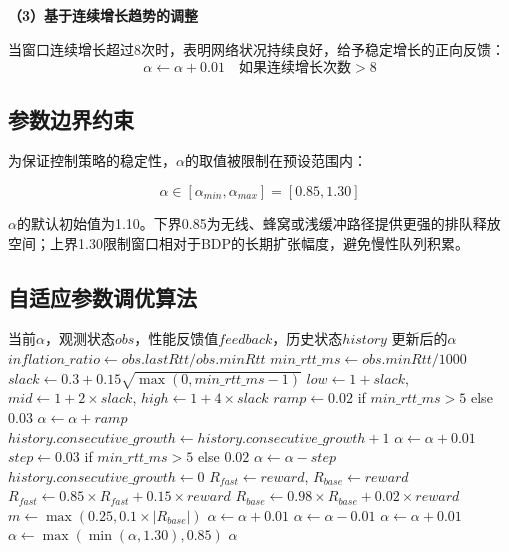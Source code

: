 \textbf{（3）基于连续增长趋势的调整}

当窗口连续增长超过8次时，表明网络状况持续良好，给予稳定增长的正向反馈：
\begin{equation}
\alpha \leftarrow \alpha + 0.01 \quad \text{如果连续增长次数} > 8
\end{equation}

\subsection{参数边界约束}

为保证控制策略的稳定性，$\alpha$的取值被限制在预设范围内：

\begin{equation}
\alpha \in [\alpha_{min}, \alpha_{max}] = [0.85, 1.30]
\end{equation}

$\alpha$的默认初始值为1.10。下界0.85为无线、蜂窝或浅缓冲路径提供更强的排队释放空间；上界1.30限制窗口相对于BDP的长期扩张幅度，避免慢性队列积累。

\subsection{自适应参数调优算法}

\begin{algorithm}[htbp]
\caption{自适应参数调优算法}
\begin{algorithmic}[1]
\Require 当前$\alpha$，观测状态$obs$，性能反馈值$feedback$，历史状态$history$
\Ensure 更新后的$\alpha$
\State {}
\State $inflation\_ratio \leftarrow obs.lastRtt / obs.minRtt$
\State $min\_rtt\_ms \leftarrow obs.minRtt / 1000$
\State $slack \leftarrow 0.3 + 0.15\sqrt{\max(0, min\_rtt\_ms-1)}$
\State $low \leftarrow 1 + slack$, $mid \leftarrow 1 + 2\times slack$, $high \leftarrow 1 + 4\times slack$
    \State $ramp \leftarrow 0.02$ if $min\_rtt\_ms > 5$ else $0.03$
    \State $\alpha \leftarrow \alpha + ramp$
    \State $history.consecutive\_growth \leftarrow history.consecutive\_growth + 1$
    \State $\alpha \leftarrow \alpha + 0.01$
    \State $step \leftarrow 0.03$ if $min\_rtt\_ms > 5$ else $0.02$
    \State $\alpha \leftarrow \alpha - step$
    \State $history.consecutive\_growth \leftarrow 0$
\EndIf
\State {}
    \State $R_{fast} \leftarrow reward$, $R_{base} \leftarrow reward$
\Else
    \State $R_{fast} \leftarrow 0.85 \times R_{fast} + 0.15 \times reward$
    \State $R_{base} \leftarrow 0.98 \times R_{base} + 0.02 \times reward$
\EndIf
\State $m \leftarrow \max(0.25, 0.1 \times |R_{base}|)$
    \State $\alpha \leftarrow \alpha + 0.01$
    \State $\alpha \leftarrow \alpha - 0.01$
\EndIf
\State {}
    \State $\alpha \leftarrow \alpha + 0.01$
\EndIf
\State {}
\State $\alpha \leftarrow \max(\min(\alpha, 1.30), 0.85)$
\State \Return $\alpha$
\end{algorithmic}
\end{algorithm}

